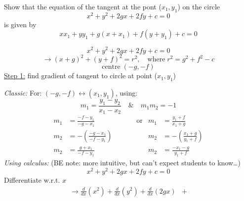 \hlquestion Show that the equation of the tangent at the pont ($x_{1},y_{1}$) 
on the circle 
\[ 
	x^{2} + y^{2} + 2gx + 2fy + c = 0
\]
is given by
\[ 
	x x_{1} + y y_{1} + g(x + x_{1}) + f(y + y_{1}) + c = 0
\]

\begin{solution}
	\[ 
		x^{2} + y^{2} + 2gx + 2fy + c = 0
	\]
	\[ 
		\rightarrow
		(x+g)^{2} + (y+f)^{2} = r^{2} 
		,\quad
		\text{where} \;
		r^{2} = g^{2} + f^{2} - c
	\]
	\[
		\text{centre} \; 
		( -g, -f )
	\]
	\underline{Step 1:} find gradient of tangent to circle at point 
	($x_{1},y_{1}$)
	\par
	\textit{Classic:}
	\newline
	For: $(-g, -f) \leftrightarrow (x_{1}, y_{1})$, using: 
	\[
		m_{1} = 
		\frac{y_{1} - y_{2}}{x_{1} - x_{2}}
		\quad
		\&
		\quad
		m_{1} m_{2} = -1
	\]
	\begin{align*}
		m_{1} 
			&= 
			\frac{-f - y_{1}}{-g - x_{1}}
			\qquad\qquad\qquad
			\text{or}
			&
			m_{1} 
				&= 
				\frac{y_{1} + f}{x_{1} + g}
			\\
		m_{2} 
			&= 
			-\left( \frac{-g - x_{1}}{-f - y_{1}} \right)
			\qquad
			&
			m_{2} 
				&= 
				- \left( \frac{x_{1} + g}{y_{1} + f} \right)
			\\
		m_{2} 
			&= 
			\frac{g + x_{1}}{-f - y_{1}}
			\qquad
			&
			m_{2} 
				&= 
				\frac{- x_{1} - g}{y_{1} + f}
	\end{align*}
	\textit{Using calculus:} 
	(BE note: more intuitive, but can't expect students to know\dots)
	\[ 
		x^{2} + y^{2} + 2gx + 2fy + c = 0
	\]
	Differentiate w.r.t. $x$
	\begin{align*}
		\rightarrow
		\frac{d}{dx}\left( x^{2} \right)
		+
		\frac{d}{dx}\left( y^{2} \right)
		+
		\frac{d}{dx}\left( 2gx \right)
			&+

\end{align*}
\end{solution}
